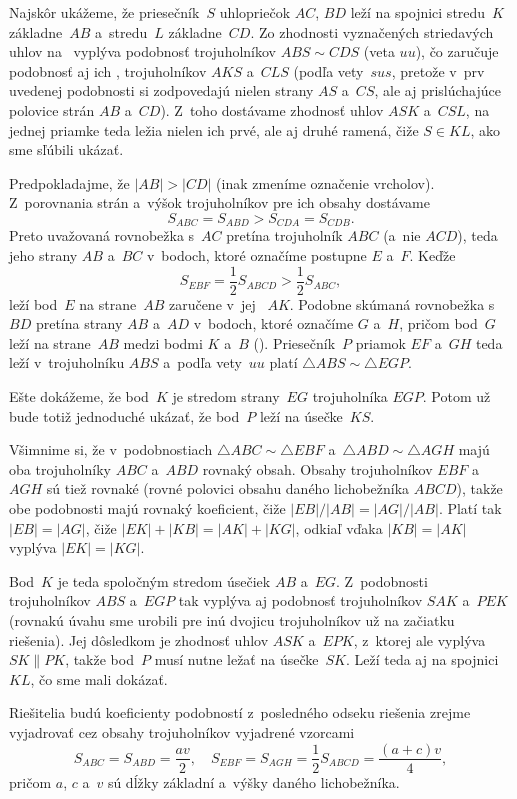 {%
Najskôr ukážeme, že priesečník~$S$ uhlopriečok $AC$, $BD$ leží
na spojnici stredu~$K$ základne~$AB$ a~stredu~$L$ základne~$CD$.
Zo zhodnosti vyznačených striedavých uhlov na \obr\
vyplýva podobnosť trojuholníkov $ABS\sim CDS$ (veta $uu$), čo zaručuje
podobnosť aj ich \uv{polovíc}, trojuholníkov $AKS$ a~$CLS$ (podľa vety~$sus$,
pretože v~prv uvedenej podobnosti si zodpovedajú nielen strany $AS$ a~$CS$,
ale aj prislúchajúce polovice strán $AB$ a~$CD$). Z~toho dostávame zhodnosť
uhlov $ASK$ a~$CSL$, na jednej priamke teda ležia nielen ich prvé, ale
aj druhé ramená, čiže $S\in KL$, ako sme sľúbili ukázať.
%

Predpokladajme, že $|AB|>|CD|$ (inak zmeníme označenie vrcholov). %
Z~porovnania strán a~výšok trojuholníkov pre ich obsahy dostávame
$$
S_{ABC}=S_{ABD}>S_{CDA}=S_{CDB}.
$$
Preto uvažovaná rovnobežka s~$AC$ pretína trojuholník $ABC$
(a~nie $ACD$), teda jeho strany $AB$ a~$BC$ v~bodoch, ktoré označíme postupne $E$ a~$F$. Keďže
$$
S_{EBF}=\frac12 S_{ABCD}>\frac12 S_{ABC},
$$
leží bod~$E$ na strane~$AB$ zaručene v~jej ~$AK$. Podobne skúmaná rovnobežka s~$BD$ pretína strany $AB$
a~$AD$ v~bodoch, ktoré označíme $G$ a~$H$, pričom bod~$G$ leží na
strane~$AB$ medzi bodmi $K$ a~$B$ (\obr). Priesečník~$P$ priamok $EF$ a~$GH$ teda leží
v~trojuholníku $ABS$ a~podľa vety~$uu$ platí $\triangle ABS\sim\triangle EGP$.
\insp{b67.3}%

Ešte dokážeme, že bod~$K$ je stredom strany~$EG$ trojuholníka $EGP$. Potom už
bude totiž jednoduché ukázať, že bod~$P$ leží na úsečke~$KS$.

Všimnime si, že v~podobnostiach $\triangle ABC\sim\triangle EBF$
a~$\triangle ABD\sim\triangle AGH$ majú oba trojuholníky $ABC$ a~$ABD$ rovnaký obsah.
Obsahy trojuholníkov $EBF$ a~$AGH$ sú tiež rovnaké (rovné polovici
obsahu daného lichobežníka $ABCD$), takže obe podobnosti majú rovnaký koeficient,
čiže $|EB|/|AB|=|AG|/|AB|$. Platí tak
$|EB|=|AG|$, čiže $|EK|+|KB|=|AK|+|KG|$, odkiaľ vďaka $|KB|=|AK|$
vyplýva $|EK|=|KG|$.

Bod~$K$ je teda spoločným stredom úsečiek $AB$ a~$EG$. Z~podobnosti trojuholníkov
$ABS$ a~$EGP$ tak vyplýva aj podobnosť trojuholníkov $SAK$ a~$PEK$ (rovnakú
úvahu sme urobili pre inú dvojicu trojuholníkov už na začiatku riešenia).
Jej dôsledkom je zhodnosť uhlov $ASK$ a~$EPK$,
z~ktorej ale vyplýva $SK\parallel PK$, takže bod~$P$ musí nutne ležať
na úsečke~$SK$. Leží teda aj na spojnici~$KL$, čo sme mali dokázať.

\poznamka
Riešitelia budú koeficienty podobností z~posledného
odseku riešenia zrejme vyjadrovať cez obsahy trojuholníkov vyjadrené
vzorcami
$$
S_{ABC}=S_{ABD}=\frac{av}{2},\quad
S_{EBF}=S_{AGH}=\frac12 S_{ABCD}=\frac{(a+c)v}{4},
$$
pričom $a$, $c$ a~$v$ sú dĺžky základní a~výšky daného lichobežníka.

}
